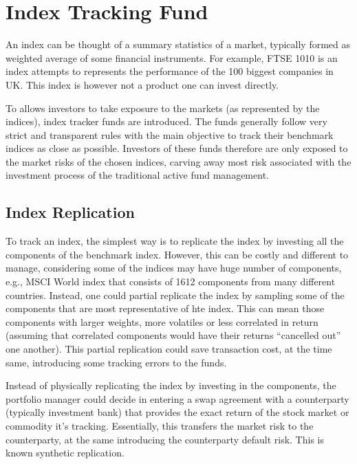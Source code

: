 \section{Index Tracking Fund}
An index can be thought of a summary statistics of a market, typically formed as weighted average of some financial instruments. For example, FTSE 1010 is an index attempts to represents the performance of the 100 biggest companies in UK. This index is however not a product one can invest directly.

To allows investors to take exposure to the markets (as represented by the indices), index tracker funds are introduced. The funds generally follow very strict and transparent rules with the main objective to track their benchmark indices as close as possible. Investors of these funds therefore are only exposed to the market risks of the chosen indices, carving away most risk associated with the investment process of the traditional active fund management. 

\subsection{Index Replication}
To track an index, the simplest way is to replicate the index by investing all the components of the benchmark index. However, this can be costly and different to manage, considering some of the indices may have huge number of components, e.g., MSCI World index that consists of 1612 components from many different countries. Instead, one could partial replicate the index by sampling some of the components that are most representative of hte index. This can mean those components with larger weights, more volatiles or less correlated in return (assuming that correlated components would have their returns ``cancelled out'' one another). This partial replication could save transaction cost, at the time same, introducing some tracking errors to the funds.

Instead of physically replicating the index by investing in the components, the portfolio manager could decide in entering a swap agreement with a counterparty (typically investment bank) that provides the exact return of the stock market or commodity it’s tracking. Essentially, this transfers the market risk to the counterparty, at the same introducing the counterparty default risk. This is known synthetic replication. 

